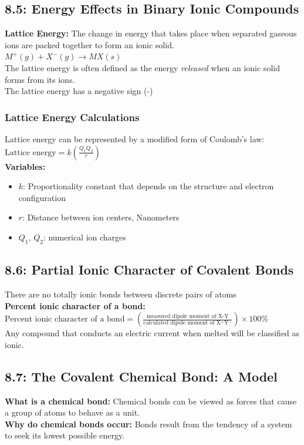 \documentclass[12pt]{extarticle}
\begin{document}
\subsection*{8.5: Energy Effects in Binary Ionic Compounds}
\textbf{Lattice Energy:}
The change in energy that takes place when separated gaseous ions are packed together to form an ionic solid.
\\$M^+(g) + X^-(g) \rightarrow MX(s)$
\\The lattice energy is often defined as the energy \textit{released} when an ionic solid forms from its ions.
\\The lattice energy has a negative sign (-)
\subsubsection*{Lattice Energy Calculations}
Lattice energy can be represented by a modified form of Coulomb’s law:
\\$\text{Lattice energy} = k(\frac{Q_1Q_2}{r})$
\\\textbf{Variables:}
\begin{itemize}[label={}]
    \item $k$: Proportionality constant that depends on the structure and electron configuration
    \item $r$: Distance between ion centers, Nanometers
    \item $Q_1$, $Q_2$: numerical ion charges
\end{itemize}

\subsection*{8.6: Partial Ionic Character of Covalent Bonds}
There are no totally ionic bonds between discrete pairs of atoms
\\\textbf{Percent ionic character of a bond:}
\\$\text{Percent ionic character of a bond} = (\frac{\text{measured dipole moment of X-Y}}{\text{calculated dipole moment of X$^+$Y$^-$}})\times100\%$
\\Any compound that conducts an electric current when melted will be classified as ionic.

\subsection*{8.7: The Covalent Chemical Bond: A Model}
\textbf{What is a chemical bond:}
Chemical bonds can be viewed as forces that cause a group of atoms to behave as a unit.
\\\textbf{Why do chemical bonds occur:}
Bonds result from the tendency of a system to seek its lowest possible energy.
\end{document}
